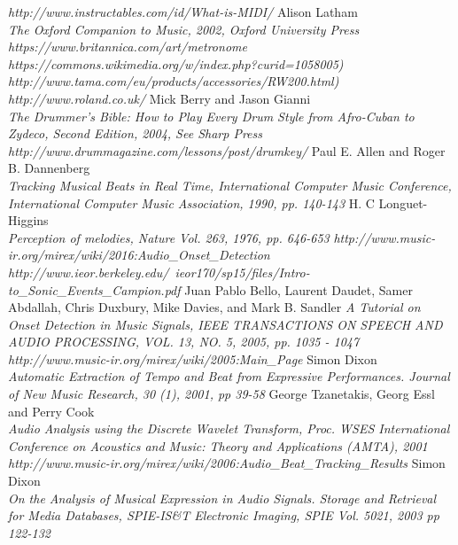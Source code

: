 \documentclass[a4paper, 11pt]{article}
\begin{document}
\newpage
\begin{thebibliography}{99}
\textit{http://www.instructables.com/id/What-is-MIDI/}
Alison Latham\\
\textit{The Oxford Companion to Music, 2002, Oxford University Press}
\textit{https://www.britannica.com/art/metronome}
\textit{https://commons.wikimedia.org/w/index.php?curid=1058005)}
\textit{http://www.tama.com/eu/products/accessories/RW200.html)}
\textit{http://www.roland.co.uk/}
Mick Berry and Jason Gianni\\
\textit{The Drummer's Bible: How to Play Every Drum Style from Afro-Cuban to Zydeco, Second Edition, 2004, See Sharp Press}
\textit{http://www.drummagazine.com/lessons/post/drumkey/}
Paul E. Allen and Roger B. Dannenberg\\
\textit{Tracking Musical Beats in Real Time, International Computer Music Conference, International Computer Music Association, 1990, pp. 140-143}
H. C Longuet-Higgins\\
\textit{Perception of melodies, Nature Vol. 263, 1976, pp. 646-653}
\textit{http://www.music-ir.org/mirex/wiki/2016:Audio\_Onset\_Detection}
\textit{http://www.ieor.berkeley.edu/~ieor170/sp15/files/Intro-to\_Sonic\_Events\_Campion.pdf}
Juan Pablo Bello, Laurent Daudet, Samer Abdallah, Chris Duxbury, Mike Davies, and Mark B. Sandler 
\textit{A Tutorial on Onset Detection in Music Signals, IEEE TRANSACTIONS ON SPEECH AND AUDIO PROCESSING, VOL. 13, NO. 5, 2005, pp. 1035 - 1047}
\textit{http://www.music-ir.org/mirex/wiki/2005:Main\_Page}
Simon Dixon\\
\textit{Automatic Extraction of Tempo and Beat from Expressive Performances. Journal of New Music Research, 30 (1), 2001, pp 39-58}
George Tzanetakis, Georg Essl and Perry Cook\\
\textit{Audio Analysis using the Discrete Wavelet Transform, Proc. WSES International Conference on Acoustics and Music: Theory and Applications (AMTA), 2001}
\textit{http://www.music-ir.org/mirex/wiki/2006:Audio\_Beat\_Tracking\_Results}
Simon Dixon\\
\textit{On the Analysis of Musical Expression in Audio Signals. Storage and Retrieval for Media Databases, SPIE-IS\&T Electronic Imaging, SPIE Vol. 5021, 2003 pp 122-132}

\end{thebibliography}
\end{document}
